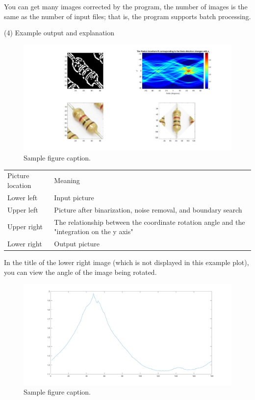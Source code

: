 \documentclass{article}
\begin{document}
You can get many images corrected by the program, the number of images is the same as the number of input files; that is, the program supports batch processing.

(4) Example output and explanation

\begin{figure}
	\centering
	\includegraphics[width=0.7\linewidth]{DmQ3syQ.jpg}
	\caption{Sample figure caption.}
	\label{fig:DmQ3syQjpg}
\end{figure}

\begin{table}[]
	\begin{tabular}{ll}
		Picture location & Meaning                                                                                    \\
		Lower left       & Input picture                                                                              \\
		Upper left       & Picture after binarization, noise removal, and boundary search                             \\
		Upper right      & The relationship between the coordinate rotation angle and the "integration on the y axis" \\
		Lower right      & Output picture                                                                            
	\end{tabular}
\end{table}

In the title of the lower right image (which is not displayed in this example plot), you can view the angle of the image being rotated.


\begin{figure}
	\centering
	\includegraphics[width=0.7\linewidth]{JFMMrt3.png}
	\caption{Sample figure caption.}
	\label{fig:JFMMrt3jpg}
\end{figure}
\end{document}
